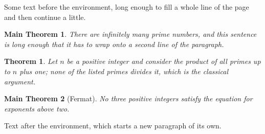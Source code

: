 \documentclass[11pt]{article}
\newtheorem*{theorem*}{Main Theorem}
\newtheorem{theorem}{Theorem}
\begin{document}
Some text before the environment, long enough to fill a whole line of the page and then continue a little.
\begin{theorem*}
There are infinitely many prime numbers, and this sentence is long enough that it has to wrap onto a second line of the paragraph.
\end{theorem*}
\begin{theorem}
Let $n$ be a positive integer and consider the product of all primes up to $n$ plus one; none of the listed primes divides it, which is the classical argument.
\end{theorem}
\begin{theorem*}[Fermat]
No three positive integers satisfy the equation for exponents above two.
\end{theorem*}
Text after the environment, which starts a new paragraph of its own.
\end{document}
